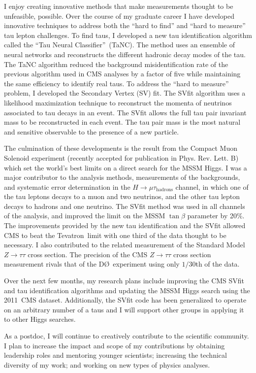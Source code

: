\documentclass{scrartcl}        %
\begin{document}
\begin{cv}{}
I enjoy creating innovative methods that make measurements thought to be
unfeasible, possible.  Over the course of my graduate career I have developed
innovative techniques to address both the ``hard to find'' and ``hard to
measure'' tau lepton challenges.  To find taus, I developed a new tau
identification algorithm called the ``Tau Neural Classifier''~(TaNC).  The
method uses an ensemble of neural networks and reconstructs the different
hadronic decay modes of the tau.  The TaNC algorithm reduced the background
misidentification rate of the previous algorithm used in CMS analyses by a
factor of five while maintaining the same efficiency to identify real taus.  To
address the ``hard to measure'' problem, I developed the Secondary Vertex (SV)
fit.  The SVfit algorithm uses a likelihood maximization technique to
reconstruct the momenta of neutrinos associated to tau decays in an event.  The
SVfit allows the full tau pair invariant mass to be reconstructed in each
event. The tau pair mass is the most natural and sensitive observable to
the presence of a new particle.

The culmination of these developments is the result from the Compact Muon
Solenoid experiment (recently accepted for publication in Phys.  Rev. Lett. B)
which set the world's best limits on a direct search for the MSSM Higgs.  I was
a major contributor to the analysis methods, measurements of the backgrounds,
and systematic error determination in the $H \to \mu \tau_{\mathrm{hadrons}}$
channel, in which one of the tau leptons decays to a muon and two neutrinos, and
the other tau lepton decays to hadrons and one neutrino.  The SVfit method was
used in all channels of the analysis, and improved the limit on the MSSM
$\tan\beta$ parameter by 20\%.  The improvements provided by the new tau
identification and the SVfit allowed CMS to beat the Tevatron~limit with
one third of the data thought to be necessary.  I also contributed to the
related measurement of the Standard Model $Z\to\tau\tau$ cross section. The
precision of the CMS $Z\to\tau\tau$ cross section measurement rivals that of the
D\O~experiment using only $1/30$th of the data. 

Over the next few months, my research plans include improving the CMS SVfit and
tau identification algorithms and updating the MSSM Higgs search using the
2011~CMS dataset.  Additionally, the SVfit code has been generalized to
operate on an arbitrary number of a taus and I will support other groups in
applying it to other Higgs searches.  

As a postdoc, I will continue to creatively contribute to the scientific
community. I plan to increase the impact and scope of my contributions by
obtaining leadership roles and mentoring younger scientists; increasing the
technical diversity of my work; and working on new types of physics analyses.


\end{cv}
\end{document}
